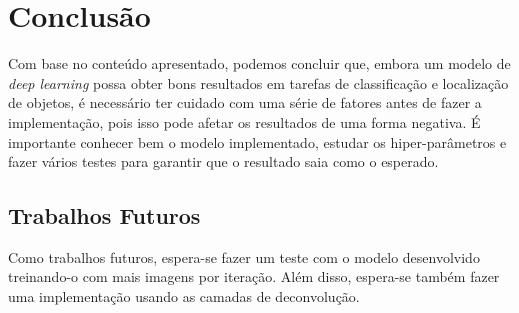 \chapter{Conclusão}
\label{cap:2}

Com base no conteúdo apresentado, podemos concluir que, embora um modelo de \textit{deep learning} possa obter bons resultados em tarefas de classificação e localização de objetos, é necessário ter cuidado com uma série de fatores antes de fazer a implementação, pois isso pode afetar os resultados de uma forma negativa. É importante conhecer bem o modelo implementado, estudar os hiper-parâmetros e fazer vários testes para garantir que o resultado saia como o esperado.

\section{Trabalhos Futuros}

Como trabalhos futuros, espera-se fazer um teste com o modelo desenvolvido treinando-o com mais imagens por iteração. Além disso, espera-se também fazer uma implementação usando as camadas de deconvolução.